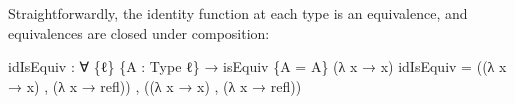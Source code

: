\documentclass[
  11pt,
  oneside,
  article]{memoir}
\newenvironment{Shaded}{}{}
\newcommand{\NormalTok}[1]{#1}
\newcommand{\OtherTok}[1]{\textcolor[rgb]{0.00,0.44,0.13}{#1}}
\theoremstyle{definition}
\theoremstyle{plain}
\newcommand{\0}{\textsf{0}}
\newcommand{\1}{\tn{\textsf{1}}}
\begin{document}
Straightforwardly, the identity function at each type is an equivalence,
and equivalences are closed under composition:

\begin{Shaded}
\begin{Highlighting}[]
\NormalTok{idIsEquiv }\OtherTok{:} \OtherTok{∀} \OtherTok{\{}\NormalTok{ℓ}\OtherTok{\}} \OtherTok{\{}\NormalTok{A }\OtherTok{:}\NormalTok{ Type ℓ}\OtherTok{\}} \OtherTok{→}\NormalTok{ isEquiv }\OtherTok{\{}\NormalTok{A }\OtherTok{=}\NormalTok{ A}\OtherTok{\}} \OtherTok{(λ}\NormalTok{ x }\OtherTok{→}\NormalTok{ x}\OtherTok{)}
\NormalTok{idIsEquiv }\OtherTok{=} \OtherTok{((λ}\NormalTok{ x }\OtherTok{→}\NormalTok{ x}\OtherTok{)}\NormalTok{ , }\OtherTok{(λ}\NormalTok{ x }\OtherTok{→}\NormalTok{ refl}\OtherTok{))}\NormalTok{ , }\OtherTok{((λ}\NormalTok{ x }\OtherTok{→}\NormalTok{ x}\OtherTok{)}\NormalTok{ , }\OtherTok{(λ}\NormalTok{ x }\OtherTok{→}\NormalTok{ refl}\OtherTok{))}


\end{Highlighting}
\end{Shaded}
\end{document}
